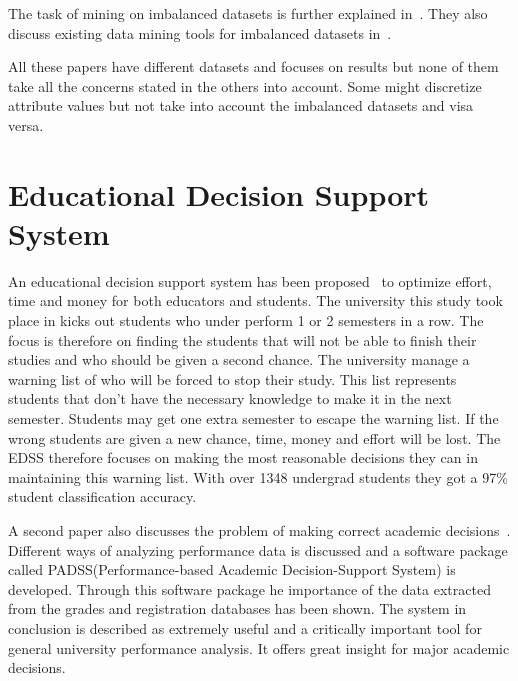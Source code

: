 \bigskip\noindent
The task of mining on imbalanced datasets is further explained in~\cite{10}.
They also discuss existing data mining tools for imbalanced datasets in~\cite{8}.

\bigskip\noindent
All these papers have different datasets and focuses on results but none of them take all the concerns stated in the others into account. 
Some might discretize attribute values but not take into account the imbalanced datasets and visa versa.

\section{Educational Decision Support System}
An educational decision support system has been proposed~\cite{5} to optimize effort, time and money for both educators and students. 
The university this study took place in kicks out students who under perform 1 or 2 semesters in a row.
The focus is therefore on finding the students that will not be able to finish their studies and who should be given a second chance. 
The university manage a warning list of who will be forced to stop their study. 
This list represents students that don't have the necessary knowledge to make it in the next semester. 
Students may get one extra semester to escape the warning list. 
If the wrong students are given a new chance, time, money and effort will be lost. 
The EDSS therefore focuses on making the most reasonable decisions they can in maintaining this warning list. 
With over 1348 undergrad students they got a 97\% student classification accuracy.

\bigskip\noindent
A second paper also discusses the problem of making correct academic decisions~\cite{6}. 
Different ways of analyzing performance data is discussed and a software package called PADSS(Performance-based Academic Decision-Support System) is developed. 
Through this software package he importance of the data extracted from the grades and registration databases has been shown. 
The system in conclusion is described as extremely useful and a critically important tool for general university performance analysis.
It offers great insight for major academic decisions.
